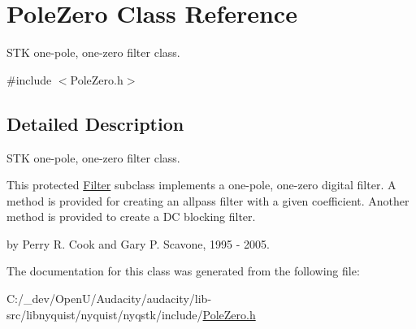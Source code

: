 \hypertarget{class_pole_zero}{}\section{Pole\+Zero Class Reference}
\label{class_pole_zero}


S\+TK one-\/pole, one-\/zero filter class.  




{\ttfamily \#include $<$Pole\+Zero.\+h$>$}



\subsection{Detailed Description}
S\+TK one-\/pole, one-\/zero filter class. 

This protected \hyperlink{class_filter}{Filter} subclass implements a one-\/pole, one-\/zero digital filter. A method is provided for creating an allpass filter with a given coefficient. Another method is provided to create a DC blocking filter.

by Perry R. Cook and Gary P. Scavone, 1995 -\/ 2005. 

The documentation for this class was generated from the following file\+:\begin{DoxyCompactItemize}
\item 
C\+:/\+\_\+dev/\+Open\+U/\+Audacity/audacity/lib-\/src/libnyquist/nyquist/nyqstk/include/\hyperlink{_pole_zero_8h}{Pole\+Zero.\+h}\end{DoxyCompactItemize}
